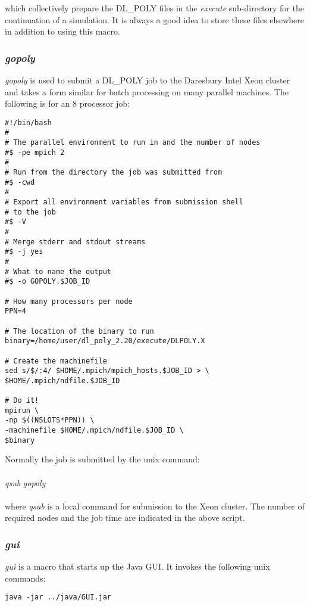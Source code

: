 \noindent which collectively prepare the DL\_POLY files in the {\em execute}
sub-directory for the continuation of a simulation. It is
always a good idea to store these files elsewhere in addition to using this
macro.

\subsubsection{{\sl gopoly}}

{\sl gopoly} is used to submit a DL\_POLY job to the Daresbury Intel Xeon
cluster and takes a form similar for batch processing on many parallel
machines. The following is for an 8 processor job:

\begin{verbatim}
#!/bin/bash
#
# The parallel environment to run in and the number of nodes
#$ -pe mpich 2
#
# Run from the directory the job was submitted from
#$ -cwd
#
# Export all environment variables from submission shell
# to the job
#$ -V
#
# Merge stderr and stdout streams
#$ -j yes
#
# What to name the output
#$ -o GOPOLY.$JOB_ID

# How many processors per node
PPN=4

# The location of the binary to run
binary=/home/user/dl_poly_2.20/execute/DLPOLY.X

# Create the machinefile
sed s/$/:4/ $HOME/.mpich/mpich_hosts.$JOB_ID > \
$HOME/.mpich/ndfile.$JOB_ID

# Do it!
mpirun \
-np $((NSLOTS*PPN)) \
-machinefile $HOME/.mpich/ndfile.$JOB_ID \
$binary
\end{verbatim}

\noindent Normally the job is submitted by the unix command:\\~\\
{\sl qsub} {\sl gopoly}\\~\\
\noindent where {\sl qsub} is a local command for submission to the Xeon
cluster. The number of required nodes and the job time are indicated in the
above script.

\subsubsection{\sl gui}

{\sl gui} is a macro that starts up the \D{} Java GUI. It invokes the
following unix commands:

\begin{verbatim}
java -jar ../java/GUI.jar
\end{verbatim}

